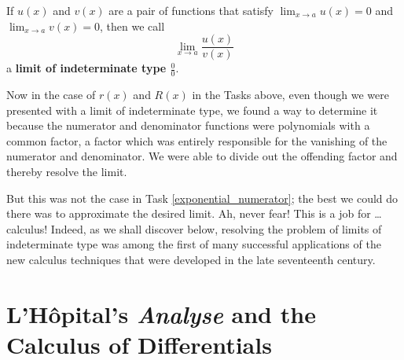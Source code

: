 \message{ !name(LHopitalsRule_2021.03.29.tex)}\documentclass[11pt]{article}
\newcounter{tasknumb}
\newcommand{\tasknumb}[1]{\refstepcounter{tasknumb}\textmd{\textbf{$\fbox{$\fbox{Task \thetasknumb}$}$}}#1}
\begin{document}
If $u(x)$ and $v(x)$ are a pair of functions that satisfy ${\displaystyle \lim_{x\to a}} u(x)=0$ and ${\displaystyle \lim_{x\to a}} v(x)=0$, then we call 
\begin{equation}\label{indeterminate}
\lim_{x\to a} \frac{u(x)}{v(x)}
\end{equation}
 a {\bf limit of indeterminate type $\frac00$}.

Now in the case of $r(x)$ and $R(x)$ in the Tasks above, even though we were presented with a limit of indeterminate type, we found a way to determine it because the numerator and denominator functions were polynomials with a common factor, a factor which was entirely responsible for the vanishing of the numerator and denominator. We were able to divide out the offending factor and thereby resolve the limit. 

But this was not the case in Task \ref{exponential_numerator}; the best we could do there was to approximate the desired limit. Ah, never fear! This is a job for \dots calculus! Indeed, as we shall discover below, resolving the problem of limits of indeterminate type was among the first of many successful applications of the new calculus techniques that were developed in the late seventeenth century.
\bigskip

\section{L'H\^opital's \emph{Analyse} and the Calculus of Differentials}
\end{document}
